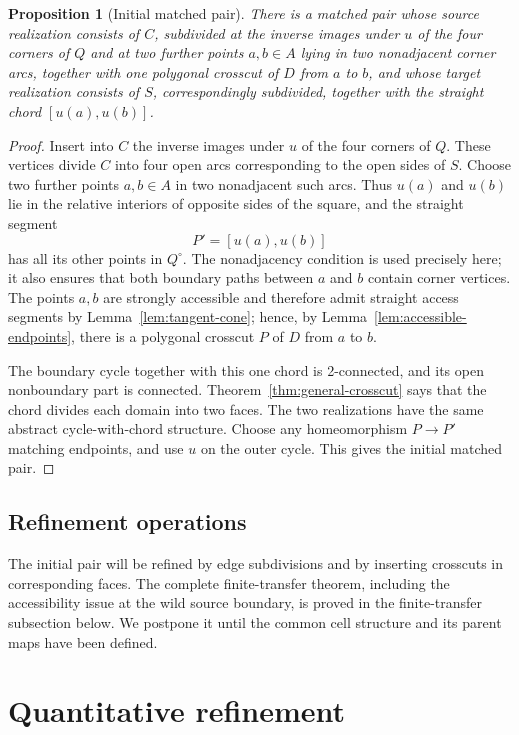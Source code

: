 \documentclass[11pt]{article}
\theoremstyle{mainplain}
\newtheorem{proposition}[theorem]{Proposition}
\theoremstyle{mainroman}
\theoremstyle{definition}
\numberwithin{equation}{section}
\begin{document}
\begin{proposition}[Initial matched pair]\label{prop:initial-pair}
There is a matched pair whose source realization consists of $C$,
subdivided at the inverse images under $u$ of the four corners of $Q$
and at two further points $a,b\in A$ lying in two nonadjacent corner
arcs, together with one polygonal crosscut of $D$ from $a$ to $b$, and
whose target realization consists of $S$, correspondingly subdivided,
together with the straight chord $[u(a),u(b)]$.
\end{proposition}
\begin{proof}
Insert into \(C\) the inverse images under \(u\) of the four corners of \(Q\). These vertices divide \(C\) into four open arcs corresponding to the open sides of \(S\). Choose two further points \(a,b\in A\) in two nonadjacent such arcs. Thus \(u(a)\) and \(u(b)\) lie in the relative interiors of opposite sides of the square, and the straight segment
\[
 P'=[u(a),u(b)]
\]
has all its other points in \(Q^\circ\). The nonadjacency condition is
used precisely here; it also ensures that both boundary paths between
\(a\) and \(b\) contain corner vertices. The points $a,b$ are strongly
accessible and therefore admit straight access segments by
Lemma~\ref{lem:tangent-cone}; hence, by
Lemma~\ref{lem:accessible-endpoints}, there is a polygonal crosscut \(P\) of
\(D\) from \(a\) to \(b\).

The boundary cycle together with this one chord is 2-connected, and
its open nonboundary part is connected. Theorem~\ref{thm:general-crosscut} says that the chord divides each domain into two faces. The two realizations have the same abstract cycle-with-chord structure. Choose any homeomorphism \(P\to P'\) matching endpoints, and use \(u\) on the outer cycle. This gives the initial matched pair.
\end{proof}

\subsection{Refinement operations}\label{refinement-operations}

The initial pair will be refined by edge subdivisions and by inserting crosscuts in corresponding faces. The complete finite-transfer theorem, including the accessibility issue at the wild source boundary, is proved in the finite-transfer subsection below. We postpone it until the common cell structure and its parent maps have been defined.

\section{Quantitative refinement}\label{quantitative-refinement}
\end{document}
